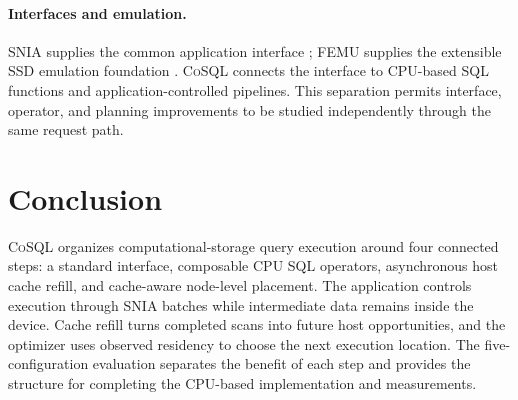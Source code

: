 \documentclass[sigconf, nonacm]{acmart}
\newcommand{\sys}{\textsc{CoSQL}}
\begin{document}
\paragraph{Interfaces and emulation.}
SNIA supplies the common application interface \cite{snia}; FEMU supplies the
extensible SSD emulation foundation \cite{femu}. \sys{} connects the interface
to CPU-based SQL functions and application-controlled pipelines. This
separation permits interface, operator, and planning improvements to be
studied independently through the same request path.

\section{Conclusion}
\sys{} organizes computational-storage query execution around four connected
steps: a standard interface, composable CPU SQL operators, asynchronous host
cache refill, and cache-aware node-level placement. The application controls
execution through SNIA batches while intermediate data remains inside the
device. Cache refill turns completed scans into future host opportunities,
and the optimizer uses observed residency to choose the next execution
location. The five-configuration evaluation separates the benefit of each
step and provides the structure for completing the CPU-based implementation
and measurements.



\end{document}
